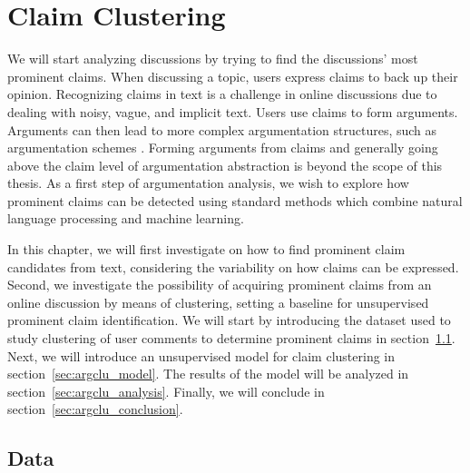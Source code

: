 \chapter{Claim Clustering}
\label{chap:argclu}


We will start analyzing discussions by trying to find the discussions' most
prominent claims.
When discussing a topic, users express claims to back up their opinion. 
Recognizing claims in text is a challenge in online discussions due to 
dealing with noisy, vague, and implicit text. 
Users use claims to form arguments. 
Arguments can then lead to more complex 
argumentation structures, such as argumentation schemes \citep{walton2008argumentation}. 
Forming arguments from claims and generally going above the claim level of
argumentation abstraction is beyond the scope of this thesis. 
As a first step of argumentation analysis, we wish to explore how prominent
claims can be detected using standard methods which combine natural language
processing and machine learning. 

In this chapter, we will first investigate on how to find 
prominent claim candidates from text, considering the variability on how 
claims can be expressed. Second, we investigate the possibility of 
acquiring prominent claims from an online discussion by means of clustering, 
setting a baseline for unsupervised prominent claim identification. 
We will start by introducing the dataset used to study clustering of
user comments to determine prominent claims in section~\ref{sec:argclu_data}.
Next, we will introduce an unsupervised
model for claim clustering in section~\ref{sec:argclu_model}.
The results of the model will be analyzed in section~\ref{sec:argclu_analysis}.
Finally, we will conclude in section~\ref{sec:argclu_conclusion}. 

\section{Data}
\label{sec:argclu_data}

